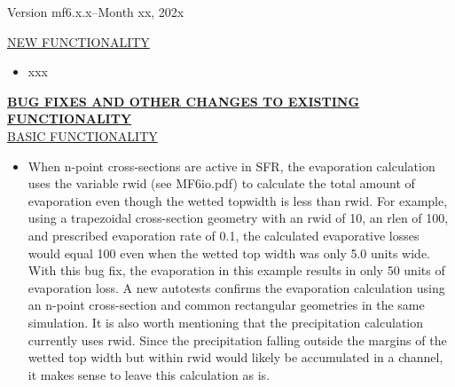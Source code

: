 	
	\item Version mf6.x.x--Month xx, 202x
	
	\underline{NEW FUNCTIONALITY}
	\begin{itemize}
		\item xxx
	\end{itemize}


	\textbf{\underline{BUG FIXES AND OTHER CHANGES TO EXISTING FUNCTIONALITY}} \\
	\underline{BASIC FUNCTIONALITY}
	\begin{itemize}
		\item When n-point cross-sections are active in SFR, the evaporation calculation uses the variable rwid (see MF6io.pdf) to calculate the total amount of evaporation even though the wetted topwidth is less than rwid.  For example, using a trapezoidal cross-section geometry with an rwid of 10, an rlen of 100, and prescribed evaporation rate of 0.1, the calculated evaporative losses would equal 100 even when the wetted top width was only 5.0 units wide.  With this bug fix, the evaporation in this example results in only 50 units of evaporation loss.  A new autotests confirms the evaporation calculation using an n-point cross-section and common rectangular geometries in the same simulation.  It is also worth mentioning that the precipitation calculation currently uses rwid.  Since the precipitation falling outside the margins of the wetted top width but within rwid would likely be accumulated in a channel, it makes sense to leave this calculation as is.
	\end{itemize}

